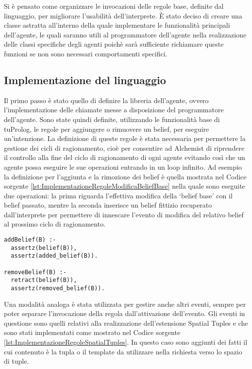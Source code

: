 Si è pensato come organizzare le invocazioni delle regole base, definite dal linguaggio, per migliorare l'usabilità dell'interprete. È stato deciso di creare una classe astratta all'interno della quale implementare le funzionalità principali dell'agente, le quali saranno utili al programmatore dell'agente nella realizzazione delle classi specifiche degli agenti poichè sarà sufficiente richiamare queste funzioni se non sono necessari comportamenti specifici.

\subsection{Implementazione del linguaggio}\label{sctn:ImplementazioneLinguaggio}
Il primo passo è stato quello di definire la libreria dell'agente, ovvero l'implementazione delle chiamate messe a disposizione del programmatore dell'agente. Sono state quindi definite, utilizzando le funzionalità base di tuProlog, le regole per aggiungere o rimuovere un belief, per eseguire un'intenzione.
La definizione di queste regole è stata necessaria per permettere la gestione dei cicli di ragionamento, cioè per consentire ad Alchemist di riprendere il controllo alla fine del ciclo di ragionamento di ogni agente evitando così che un agente possa eseguire le sue operazioni entrando in un loop infinito.
Ad esempio la definizione per l'aggiunta e la rimozione dei belief è quella mostrata nel Codice sorgente \ref{lst:ImplementazioneRegoleModificaBeliefBase} nella quale sono eseguite due operazioni: la prima riguarda l'effettiva modifica della `belief base' con il belief passato, mentre la seconda inserisce un belief fittizio recuperato dall'interprete per permettere di innescare l'evento di modifica del relativo belief al prossimo ciclo di ragionamento.

\switchToProlog{}
\begin{lstlisting}[float,firstnumber=1,label={lst:ImplementazioneRegoleModificaBeliefBase},caption={Implementazione regole modifica della `belief base'}]
addBelief(B) :-
  assertz(belief(B)),
  assertz(added_belief(B)).

removeBelief(B) :-
  retract(belief(B)),
  assertz(removed_belief(B)).
\end{lstlisting}

Una modalità analoga è stata utilizzata per gestire anche altri eventi, sempre per poter separare l'invocazione della regola dall'attivazione dell'evento. Gli eventi in questione sono quelli relativi alla realizzazione dell'estensione Spatial Tuples e che sono stati implementati come mostrato nel Codice sorgente \ref{lst:ImplementazioneRegoleSpatialTuples}. In questo caso sono aggiunti dei fatti il cui contenuto è la tupla o il template da utilizzare nella richiesta verso lo spazio di tuple.

